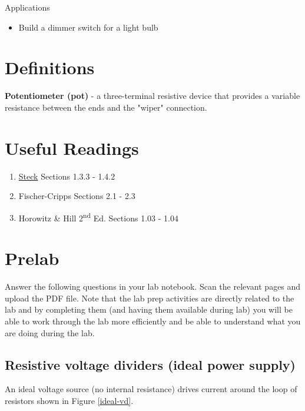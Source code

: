 \documentclass[10pt]{PhysLab1C} %
\begin{document}
Applications

\begin{itemize}
\item
  Build a dimmer switch for a light bulb
\end{itemize}


\section{Definitions}

\textbf{Potentiometer (pot)} - a three-terminal resistive device that
provides a variable resistance between the ends and the "wiper"
connection.


\section{Useful Readings}

\begin{enumerate}
\item
  \href{https://atomoptics-nas.uoregon.edu/~dsteck/teaching/electronics/electronics-notes.pdf}{Steck}
  Sections 1.3.3 - 1.4.2
\item
  Fischer-Cripps Sections 2.1 - 2.3
\item
  Horowitz \& Hill 2\textsuperscript{nd} Ed. Sections 1.03 - 1.04
\end{enumerate}


\section{Prelab}

Answer the following questions in your lab notebook. Scan the relevant
pages and upload the PDF file. Note that the lab prep activities are
directly related to the lab and by completing them (and having them
available during lab) you will be able to work through the lab more
efficiently and be able to understand what you are doing during the lab.

\subsection{Resistive voltage dividers (ideal power supply)}

An ideal voltage source (no internal resistance) drives current around
the loop of resistors shown in Figure \ref{ideal-vd}.
\end{document}
